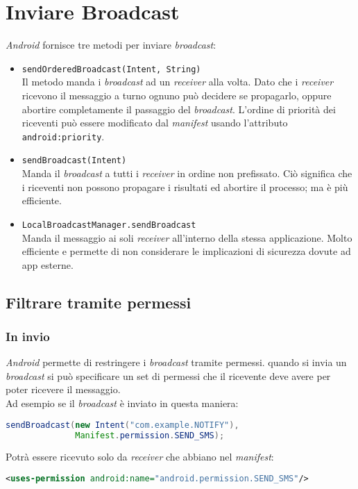 \section{Inviare Broadcast}
\textit{Android} fornisce tre metodi per inviare \textit{broadcast}:

\begin{itemize}
	\item \texttt{sendOrderedBroadcast(Intent, String)}\\
	Il metodo manda i \textit{broadcast} ad un \textit{receiver} alla volta. Dato che i \textit{receiver} ricevono il messaggio a turno ognuno può decidere se propagarlo, oppure abortire completamente il passaggio del \textit{broadcast}. L'ordine di priorità dei riceventi può essere modificato dal \textit{manifest} usando l'attributo \texttt{android:priority}.
	\item \texttt{sendBroadcast(Intent)}\\
	Manda il \textit{broadcast} a tutti i \textit{receiver} in ordine non prefissato. Ciò significa che i riceventi non possono propagare i risultati ed abortire il processo; ma è più efficiente.
	\item \texttt{LocalBroadcastManager.sendBroadcast}\\
	Manda il messaggio ai soli \textit{receiver} all'interno della stessa applicazione. Molto efficiente e permette di non considerare le implicazioni di sicurezza dovute ad app esterne.
\end{itemize}

\subsection{Filtrare tramite permessi}
\subsubsection{In invio}
\textit{Android} permette di restringere i \textit{broadcast} tramite permessi. quando si invia un \textit{broadcast} si può specificare un set di permessi che il ricevente deve avere per poter ricevere il messaggio.\\
Ad esempio se il \textit{broadcast} è inviato in questa maniera:
\begin{lstlisting}[language=Java]
sendBroadcast(new Intent("com.example.NOTIFY"),
              Manifest.permission.SEND_SMS);
\end{lstlisting}
Potrà essere ricevuto solo da \textit{receiver} che abbiano nel \textit{manifest}:
\begin{lstlisting}[language=XML]
<uses-permission android:name="android.permission.SEND_SMS"/>
\end{lstlisting}

